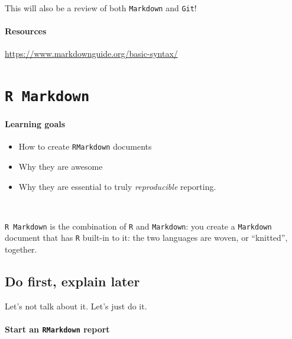 \documentclass[]{book}
\providecommand{\tightlist}{%
  \setlength{\itemsep}{0pt}\setlength{\parskip}{0pt}}
\begin{document}
This will also be a review of both \texttt{Markdown} and \texttt{Git}!

\hypertarget{resources}{%
\subsubsection*{Resources}\label{resources}}

\url{https://www.markdownguide.org/basic-syntax/}

\hypertarget{r-markdown}{%
\chapter{\texorpdfstring{\texttt{R\ Markdown}}{R Markdown}}\label{r-markdown}}

\hypertarget{learning-goals-15}{%
\subsubsection*{Learning goals}\label{learning-goals-15}}

\begin{itemize}
\tightlist
\item
  How to create \texttt{RMarkdown} documents\\
\item
  Why they are awesome\\
\item
  Why they are essential to truly \emph{reproducible} reporting.
\end{itemize}

~

\texttt{R\ Markdown} is the combination of \texttt{R} and \texttt{Markdown}: you create a \texttt{Markdown} document that has \texttt{R} built-in to it: the two languages are woven, or ``knitted'', together.

\hypertarget{do-first-explain-later}{%
\section*{Do first, explain later}\label{do-first-explain-later}}

Let's not talk about it. Let's just do it.

\hypertarget{start-an-rmarkdown-report}{%
\subsubsection*{\texorpdfstring{Start an \texttt{RMarkdown} report}{Start an RMarkdown report}}\label{start-an-rmarkdown-report}}
\end{document}

